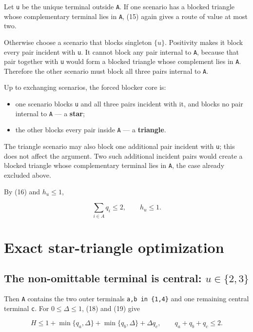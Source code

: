 \documentclass[
  11pt,
]{article}
\providecommand{\tightlist}{%
  \setlength{\itemsep}{0pt}\setlength{\parskip}{0pt}}
\begin{document}
Let \texttt{u} be the unique terminal outside \texttt{A}. If one
scenario has a blocked triangle whose complementary terminal lies in
\texttt{A}, (15) again gives a route of value at most two.

Otherwise choose a scenario that blocks singleton \(\{u\}\). Positivity
makes it block every pair incident with \texttt{u}. It cannot block any
pair internal to \texttt{A}, because that pair together with \texttt{u}
would form a blocked triangle whose complement lies in \texttt{A}.
Therefore the other scenario must block all three pairs internal to
\texttt{A}.

Up to exchanging scenarios, the forced blocker core is:

\begin{itemize}
\tightlist
\item
  one scenario blocks \texttt{u} and all three pairs incident with it,
  and blocks no pair internal to \texttt{A} --- a \textbf{star};
\item
  the other blocks every pair inside \texttt{A} --- a \textbf{triangle}.
\end{itemize}

The triangle scenario may also block one additional pair incident with
\texttt{u}; this does not affect the argument. Two such additional
incident pairs would create a blocked triangle whose complementary
terminal lies in \texttt{A}, the case already excluded above.

By (16) and \(h_u\le1\),

\[
\sum_{i\in A}q_i\le2,
\qquad
h_u\le1.
\tag{19}
\]

\section{Exact star-triangle
optimization}\label{exact-star-triangle-optimization}

\subsection{\texorpdfstring{The non-omittable terminal is central:
\(u\in\{2,3\}\)}{The non-omittable terminal is central: u\textbackslash in\textbackslash\{2,3\textbackslash\}}}\label{the-non-omittable-terminal-is-central-uin23}

Then \texttt{A} contains the two outer terminals
\texttt{a,b\ in\ \{1,4\}} and one remaining central terminal \texttt{c}.
For \(0\le\Delta\le1\), (18) and (19) give

\[
H\le
1+\min\{q_a,\Delta\}
 +\min\{q_b,\Delta\}
 +\Delta q_c,
\qquad
q_a+q_b+q_c\le2.
\tag{20}
\]
\end{document}
